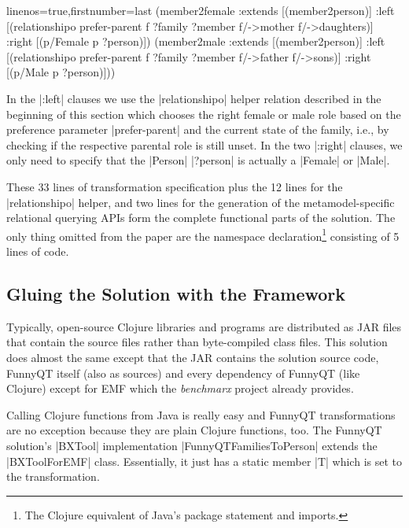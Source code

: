 \documentclass[a4paper]{article}
\newcommand{\code}{\clojureinline}
\begin{document}
\begin{clojurecode*}{linenos=true,firstnumber=last}
  (member2female
   :extends [(member2person)]
   :left  [(relationshipo prefer-parent f ?family ?member f/->mother f/->daughters)]
   :right [(p/Female p ?person)])
  (member2male
   :extends [(member2person)]
   :left  [(relationshipo prefer-parent f ?family ?member f/->father f/->sons)]
   :right [(p/Male p ?person)]))
\end{clojurecode*}

In the \code|:left| clauses we use the \code|relationshipo| helper relation
described in the beginning of this section which chooses the right female or
male role based on the preference parameter \code|prefer-parent| and the
current state of the family, i.e., by checking if the respective parental role
is still unset.  In the two \code|:right| clauses, we only need to specify that
the \code|Person| \code|?person| is actually a \code|Female| or \code|Male|.

These 33 lines of transformation specification plus the 12 lines for the
\code|relationshipo| helper, and two lines for the generation of the
metamodel-specific relational querying APIs form the complete functional parts
of the solution.  The only thing omitted from the paper are the namespace
declaration\footnote{The Clojure equivalent of Java's package statement and
  imports.}  consisting of 5 lines of code.


\subsection{Gluing the Solution with the Framework}
\label{sec:gluing}

Typically, open-source Clojure libraries and programs are distributed as JAR
files that contain the source files rather than byte-compiled class files.
This solution does almost the same except that the JAR contains the solution
source code, FunnyQT itself (also as sources) and every dependency of FunnyQT
(like Clojure) except for EMF which the \emph{benchmarx} project already
provides.

Calling Clojure functions from Java is really easy and FunnyQT transformations
are no exception because they are plain Clojure functions, too.  The FunnyQT
solution's \code|BXTool| implementation \code|FunnyQTFamiliesToPerson| extends
the \code|BXToolForEMF| class.  Essentially, it just has a static member
\code|T| which is set to the transformation.
\end{document}

